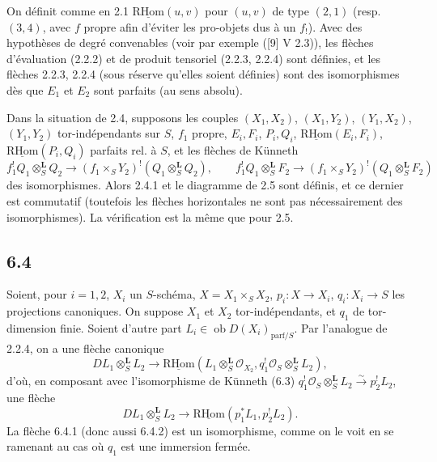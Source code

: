 \documentclass[11pt]{article}
\providecommand{\cO}{\mathcal{O}}
\newcommand{\R}{\mathrm{R}}\newcommand{\RHomCore}{\mathrm{RHom}}
\providecommand{\RHom}{\RHomCore}
\providecommand{\uRHom}{\underline{\RHom}}
\providecommand{\RHom}{\RHomCore}
\providecommand{\RHom}{\R\mathcal{H}om}
\providecommand{\R}{\mathrm R}
\providecommand{\RHom}{\RHomCore}
\begin{document}
On définit comme en 2.1 $\uRHom(u,v)$ pour $(u,v)$ de type $(2,1)$ (resp. $(3,4)$, avec $f$ propre afin d'éviter les pro-objets dus à un $f_!$). Avec des hypothèses de degré convenables (voir par exemple ([9] V 2.3)), les flèches d'évaluation (2.2.2) et de produit tensoriel (2.2.3, 2.2.4) sont définies, et les flèches 2.2.3, 2.2.4 (sous réserve qu'elles soient définies) sont des isomorphismes dès que $E_1$ et $E_2$ sont parfaits (au sens absolu).

Dans la situation de 2.4, supposons les couples $(X_1,X_2)$, $(X_1,Y_2)$, $(Y_1,X_2)$, $(Y_1,Y_2)$ tor-indépendants sur $S$, $f_1$ propre, $E_i,F_i$, $P_i,Q_i$, $\uRHom(E_i,F_i)$, $\uRHom(P_i,Q_i)$ parfaits rel. à $S$, et les flèches de Künneth
\[
f_1^!Q_1\otimes_S^{\mathbf L}Q_2\to(f_1\times_SY_2)^!(Q_1\otimes_S^{\mathbf L}Q_2),\qquad
f_1^!Q_1\otimes_S^{\mathbf L}F_2\to(f_1\times_SY_2)^!(Q_1\otimes_S^{\mathbf L}F_2)
\]
des isomorphismes. Alors 2.4.1 et le diagramme de 2.5 sont définis, et ce dernier est commutatif (toutefois les flèches horizontales ne sont pas nécessairement des isomorphismes). La vérification est la même que pour 2.5.

\subsection*{6.4}
Soient, pour $i=1,2$, $X_i$ un $S$-schéma, $X=X_1\times_SX_2$, $p_i:X\to X_i$, $q_i:X_i\to S$ les projections canoniques. On suppose $X_1$ et $X_2$ tor-indépendants, et $q_1$ de tor-dimension finie. Soient d'autre part $L_i\in\operatorname{ob}D(X_i)_{\mathrm{parf}/S}$. Par l'analogue de 2.2.4, on a une flèche canonique
\begin{equation}
\tag{6.4.1}
DL_1\otimes_S^{\mathbf L}L_2\longrightarrow \uRHom(L_1\otimes_S^{\mathbf L}\cO_{X_2},q_1^!\cO_S\otimes_S^{\mathbf L}L_2),
\end{equation}
d'où, en composant avec l'isomorphisme de Künneth (6.3) $q_1^!\cO_S\otimes_S^{\mathbf L}L_2\xrightarrow{\sim}p_2^!L_2$, une flèche
\begin{equation}
\tag{6.4.2}
DL_1\otimes_S^{\mathbf L}L_2\longrightarrow\uRHom(p_1^*L_1,p_2^!L_2).
\end{equation}
La flèche 6.4.1 (donc aussi 6.4.2) est un isomorphisme, comme on le voit en se ramenant au cas où $q_1$ est une immersion fermée.
\end{document}
